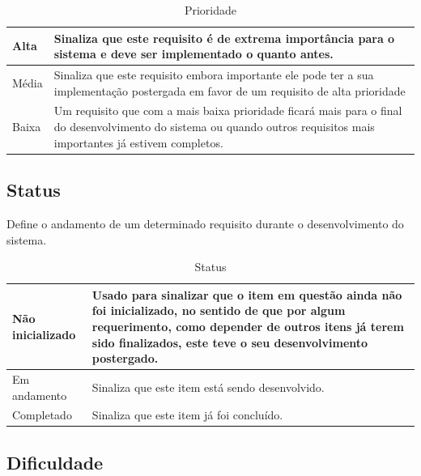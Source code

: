 \begin{apendicesenv}
\begin{table}[!h]
\centering
\caption{Prioridade}
\label{attr_prioridade}
\begin{tabular}{|p{2cm}|p{8cm}|}
\hline
Alta  & Sinaliza que este requisito é de extrema importância para o sistema e deve ser implementado o quanto antes.                                                            \\ \hline
Média & Sinaliza que este requisito embora importante ele pode ter a sua implementação postergada em favor de um requisito de alta prioridade                                  \\ \hline
Baixa & Um requisito que com a mais baixa prioridade ficará mais para o final do desenvolvimento do sistema ou quando outros requisitos mais importantes já estivem completos. \\ \hline
\end{tabular}
\end{table}

\subsection{Status}

Define o andamento de um determinado requisito durante o desenvolvimento do sistema.

\begin{table}[!h]
\centering
\caption{Status}
\label{attr_Status}
\begin{tabular}{|p{3cm}|p{8cm}|}
\hline
Não inicializado & Usado para sinalizar que o item em questão ainda não foi inicializado, no sentido de que por algum requerimento, como depender de outros itens já terem sido finalizados, este teve o seu desenvolvimento postergado. \\ \hline
Em andamento     & Sinaliza que este item está sendo desenvolvido.                                                                                                                                                                       \\ \hline
Completado       & Sinaliza que este item já foi concluído.                                                                                                                                                                              \\ \hline
\end{tabular}
\end{table}

\subsection{Dificuldade}


\end{apendicesenv}
